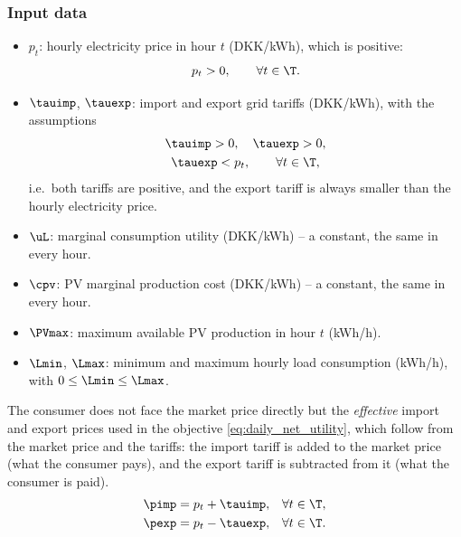 \subsubsection{Input data}
\begin{itemize}
    \item $p_t$: hourly electricity price in hour $t$ (DKK/kWh), which is positive:
    \begin{equation}
        p_t > 0, \qquad \forall t \in \T.
        \label{eq:price_positive}
    \end{equation}
    \item $\tauimp$, $\tauexp$: import and export grid tariffs (DKK/kWh), with the
    assumptions
    \begin{gather}
        \tauimp > 0, \quad \tauexp > 0, \label{eq:tariff_positive} \\
        \tauexp < p_t, \qquad \forall t \in \T, \label{eq:tariff_assumption}
    \end{gather}
    i.e.\ both tariffs are positive, and the export tariff is always smaller than the hourly
    electricity price.
    \item $\uL$: marginal consumption utility (DKK/kWh) -- a constant, the same in every
    hour.
    \item $\cpv$: PV marginal production cost (DKK/kWh) -- a constant, the same in every
    hour.
    \item $\PVmax$: maximum available PV production in hour $t$ (kWh/h).
    \item $\Lmin$, $\Lmax$: minimum and maximum hourly load consumption (kWh/h), with
    $0 \leq \Lmin \leq \Lmax$.
\end{itemize}
The consumer does not face the market price directly but the \emph{effective} import and
export prices used in the objective \eqref{eq:daily_net_utility}, which follow from the
market price and the tariffs: the import tariff is added to the market price (what the
consumer pays), and the export tariff is subtracted from it (what the consumer is paid).
\begin{align}
    \pimp &= p_t + \tauimp, & \forall t \in \T, \label{eq:effective_import_price} \\
    \pexp &= p_t - \tauexp, & \forall t \in \T. \label{eq:effective_export_price}
\end{align}

